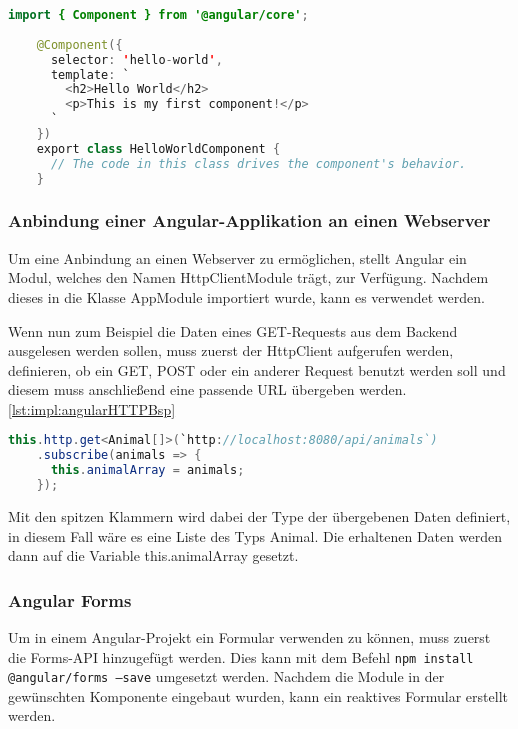 \begin{lstlisting}[language=java,caption=Beispiel für eine minimierte Angular Komponente,label=lst:impl:angularBsp]
    import { Component } from '@angular/core';
 
    @Component({
      selector: 'hello-world',
      template: `
        <h2>Hello World</h2>
        <p>This is my first component!</p>
      `
    })
    export class HelloWorldComponent {
      // The code in this class drives the component's behavior.
    }
\end{lstlisting}
\cite{angularOfficialSite}
 
\subsubsection{Anbindung einer Angular-Applikation an einen Webserver}
Um eine Anbindung an einen Webserver zu ermöglichen, stellt Angular ein Modul, welches den Namen HttpClientModule trägt, zur Verfügung. Nachdem dieses in die Klasse AppModule importiert wurde, kann es verwendet werden.
 
Wenn nun zum Beispiel die Daten eines GET-Requests aus dem Backend ausgelesen werden sollen, muss zuerst der HttpClient aufgerufen werden, definieren, ob ein GET, POST oder ein anderer Request benutzt werden soll und diesem muss anschließend eine passende URL übergeben werden. \ref{lst:impl:angularHTTPBsp}
 
\begin{lstlisting}[language=java,caption=Beispiel für einen GET-Request,label=lst:impl:angularHTTPBsp]
  this.http.get<Animal[]>(`http://localhost:8080/api/animals`)
    .subscribe(animals => {
      this.animalArray = animals;
    });
\end{lstlisting}
 
Mit den spitzen Klammern wird dabei der Type der übergebenen Daten definiert, in diesem Fall wäre es eine Liste des Typs Animal. Die erhaltenen Daten werden dann auf die Variable this.animalArray gesetzt. \cite{angularHandbuchBuch}
 
\subsubsection{Angular Forms}
Um in einem Angular-Projekt ein Formular verwenden zu können, muss zuerst die Forms-API hinzugefügt werden. Dies kann mit dem Befehl \texttt{npm install @angular/forms --save} umgesetzt werden. Nachdem die Module in der gewünschten Komponente eingebaut wurden, kann ein reaktives Formular erstellt werden.
 
